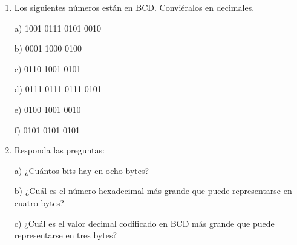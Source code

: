\documentclass[a4paper, 12pt]{article}
\newcommand{\Aspace}{0.2cm}
\begin{document}
\begin{enumerate}
 
        \item Los siguientes números están en BCD. Conviéralos en decimales.
            \vspace{\Aspace} \par
            a) 1001 0111 0101 0010
            \\ { \color{azul}  }

            \vspace{\Aspace} \par
            b) 0001 1000 0100
            \\ { \color{azul}  }

            \vspace{\Aspace} \par
            c) 0110 1001 0101
            \\ { \color{azul}  }

            \vspace{\Aspace} \par
            d) 0111 0111 0111 0101
            \\ { \color{azul}  }

            \vspace{\Aspace} \par
            e) 0100 1001 0010
            \\ { \color{azul}  }

            \vspace{\Aspace} \par
            f) 0101 0101 0101
            \\ { \color{azul}  }


        \item Responda las preguntas:
            \vspace{\Aspace} \par
            a) ¿Cuántos bits hay en ocho bytes?
            \\ { \color{azul}  }

            \vspace{\Aspace} \par
            b) ¿Cuál es el número hexadecimal más grande que puede representarse en cuatro bytes?
            \\ { \color{azul}  }

            \vspace{\Aspace} \par
            c) ¿Cuál es el valor decimal codificado en BCD más grande que puede representarse en tres bytes?
            \\ { \color{azul}  }



\end{enumerate}
\end{document}

